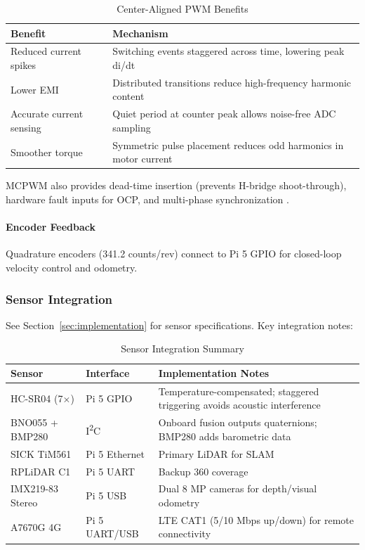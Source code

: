 \begin{table}[H]
\centering
\caption{Center-Aligned PWM Benefits}
\begin{tabular}{@{}lp{9cm}@{}}
\toprule
\textbf{Benefit} & \textbf{Mechanism} \\
\midrule
Reduced current spikes & Switching events staggered across time, lowering peak di/dt \\
Lower EMI & Distributed transitions reduce high-frequency harmonic content \\
Accurate current sensing & Quiet period at counter peak allows noise-free ADC sampling \\
Smoother torque & Symmetric pulse placement reduces odd harmonics in motor current \\
\bottomrule
\end{tabular}
\end{table}

MCPWM also provides dead-time insertion (prevents H-bridge shoot-through), hardware fault inputs for OCP, and multi-phase synchronization \parencite{esp_idf_mcpwm}.

\paragraph{Encoder Feedback}

Quadrature encoders (341.2 counts/rev) connect to Pi 5 GPIO for closed-loop velocity control and odometry.

\subsubsection{Sensor Integration}

See Section~\ref{sec:implementation} for sensor specifications. Key integration notes:

\begin{table}[H]
\centering
\caption{Sensor Integration Summary}
\begin{tabular}{@{}llp{7cm}@{}}
\toprule
\textbf{Sensor} & \textbf{Interface} & \textbf{Implementation Notes} \\
\midrule
HC-SR04 (7$\times$) & Pi 5 GPIO & Temperature-compensated; staggered triggering avoids acoustic interference \\
BNO055 + BMP280 & I\textsuperscript{2}C & Onboard fusion outputs quaternions; BMP280 adds barometric data \\
SICK TiM561 & Pi 5 Ethernet & Primary LiDAR for SLAM \\
RPLiDAR C1 & Pi 5 UART & Backup 360\textdegree{} coverage \\
IMX219-83 Stereo & Pi 5 USB & Dual 8 MP cameras for depth/visual odometry \\
A7670G 4G & Pi 5 UART/USB & LTE CAT1 (5/10 Mbps up/down) for remote connectivity \\
\bottomrule
\end{tabular}
\end{table}

